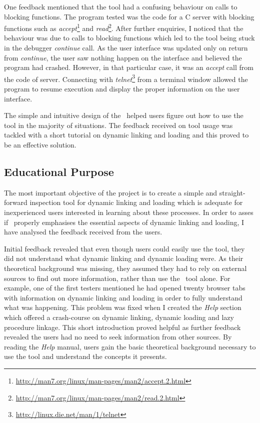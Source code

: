 One feedback mentioned that the tool had a confusing behaviour on calls to blocking functions. The program tested was the code for a C server with blocking functions such as \textit{accept}\footnote{\url{http://man7.org/linux/man-pages/man2/accept.2.html}} and \textit{read}\footnote{\url{http://man7.org/linux/man-pages/man2/read.2.html}}. After further enquiries, I noticed that the behaviour was due to calls to blocking functions which led to the tool being stuck in the debugger \textit{continue} call. As the user interface was updated only on return from \textit{continue}, the user saw nothing happen on the interface and believed the program had crashed. However, in that particular case, it was an \textit{accept} call from the code of server. Connecting with \textit{telnet}\footnote{\url{http://linux.die.net/man/1/telnet}} from a terminal window allowed the program to resume execution and display the proper information on the user interface.

The simple and intuitive design of the \gui\ helped users figure out how to use the tool in the majority of situations. The feedback received on tool usage was tackled with a short tutorial on dynamic linking and loading and this proved to be an effective solution.

\subsection{Educational Purpose}
\label{sub-sec:educational-purpose-feedback}

The most important objective of the project is to create a simple and straight-forward inspection tool for dynamic linking and loading which is adequate for inexperienced users interested in learning about these processes. In order to asses if \project\ properly emphasises the essential aspects of dynamic linking and loading, I have analysed the feedback received from the users.

Initial feedback revealed that even though users could easily use the tool, they did not understand what dynamic linking and dynamic loading were. As their theoretical background was missing, they assumed they had to rely on external sources to find out more information, rather than use the \project\ tool alone. For example, one of the first testers mentioned he had opened twenty browser tabs with information on dynamic linking and loading in order to fully understand what was happening. This problem was fixed when I created the \textit{Help} section which offered a crash-course on dynamic linking, dynamic loading and lazy procedure linkage. This short introduction proved helpful as further feedback revealed the users had no need to seek information from other sources. By reading the \textit{Help} manual, users gain the basic theoretical background necessary to use the tool and understand the concepts it presents. 

